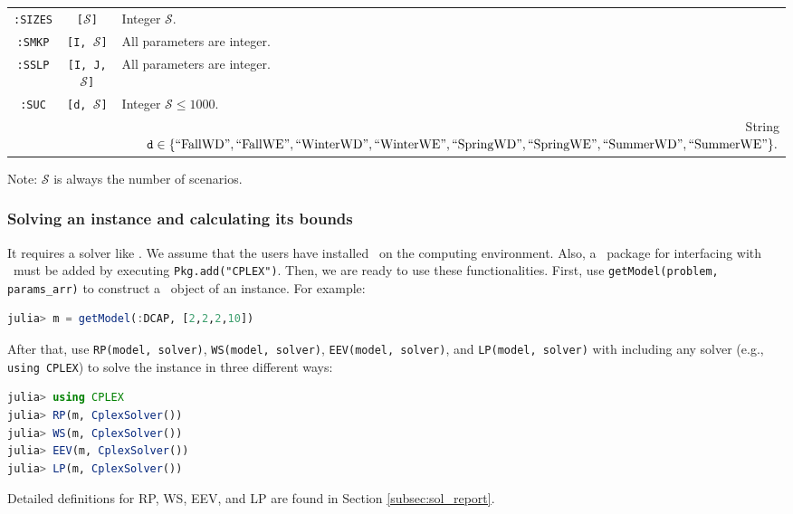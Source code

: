 \begin{table}[H]
{\begin{threeparttable}
\begin{tabular}{@{}ccl@{}}
				\texttt{:SIZES}              & \texttt{[$\mathcal{S}$]}          & Integer $\mathcal{S}$.                                                                                   \\
				\texttt{:SMKP}               & \texttt{[I, $\mathcal{S}$]}       & All parameters are integer.                                                                                                                \\
				\texttt{:SSLP}               & \texttt{[I, J, $\mathcal{S}$]}    & All parameters are integer.                                                                                                                \\
				\texttt{:SUC}                & \texttt{[d, $\mathcal{S}$]}       & \multicolumn{1}{l}{Integer $\mathcal{S}\le 1000$.}                                             \\
				\multicolumn{1}{l}{}         & \multicolumn{1}{l}{}            & \multicolumn{1}{r}{String $\texttt{d}\in \{\mathrm{``FallWD"}, \mathrm{``FallWE"}, \mathrm{``WinterWD"}, \mathrm{``WinterWE"}, \mathrm{``SpringWD"}, \mathrm{``SpringWE"}, \mathrm{``SummerWD"}, \mathrm{``SummerWE"} \}.$}\\				
				\bottomrule
			\end{tabular}
			\begin{tablenotes}
				\item Note: $\mathcal{S}$ is always the number of scenarios.
			\end{tablenotes}
		\end{threeparttable}
	}
\end{table}

\subsubsection{Solving an instance and calculating its bounds}
It requires a solver like \cplex. We assume that the users have installed \cplex\ on the computing environment. Also, a \julia\ package for interfacing with \cplex\ must be added by executing \texttt{Pkg.add("CPLEX")}. Then, we are ready to use these functionalities. First, use \texttt{getModel(problem, params\_arr)} to construct a \jumpmodel\ object of an instance. For example:
\begin{lstlisting}[frame=single,language=julia]
julia> m = getModel(:DCAP, [2,2,2,10])
\end{lstlisting}
After that, use \texttt{RP(model, solver)}, \texttt{WS(model, solver)}, \texttt{EEV(model, solver)}, and \texttt{LP(model, solver)} with including any solver (e.g., \texttt{using CPLEX}) to solve the instance in three different ways:
\begin{lstlisting}[frame=single,language=julia]
julia> using CPLEX
julia> RP(m, CplexSolver())
julia> WS(m, CplexSolver())
julia> EEV(m, CplexSolver())
julia> LP(m, CplexSolver())
\end{lstlisting}
Detailed definitions for RP, WS, EEV, and LP are found in Section \ref{subsec:sol_report}.

